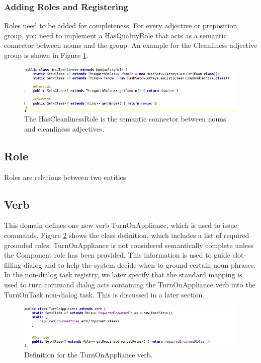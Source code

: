 \documentclass[titlepage]{article}
\begin{document}
\subsubsection{Adding Roles and Registering}

Roles need to be added for completeness.
For every adjective or preposition group, you need to implement a HasQualityRole that acts as a semantic connector between nouns and the group.
An example for the Cleanliness adjective group is shown in Figure \ref{fig:has_cleanliness_role}.

\begin{figure}[h!]
\centering
\includegraphics[width=\textwidth]{HasCleanlinessRole}
\caption{The HasCleanlinessRole is the semantic connector between nouns and cleanliness adjectives.}
\label{fig:has_cleanliness_role}
\end{figure}



\subsection{Role}
Roles are relations between two entities

\subsection{Verb}
This domain defines one new verb TurnOnAppliance, which is used to issue commands.
Figure \ref{fig:turn_on_appliance} shows the class definition, which includes a list of required grounded roles.
TurnOnAppliance is not considered semantically complete unless the Component role has been provided.
This information is used to guide slot-filling dialog and to help the system decide when to ground certain noun phrases.
In the non-dialog task registry, we later specify that the standard mapping is used to turn command dialog acts containing the TurnOnAppliance verb into the TurnOnTask non-dialog task.
This is discussed in a later section.

\begin{figure}[h!]
\centering
\includegraphics[width=\textwidth]{TurnOnAppliance}
\caption{Definition for the TurnOnAppliance verb.}
\label{fig:turn_on_appliance}
\end{figure}
\end{document}
